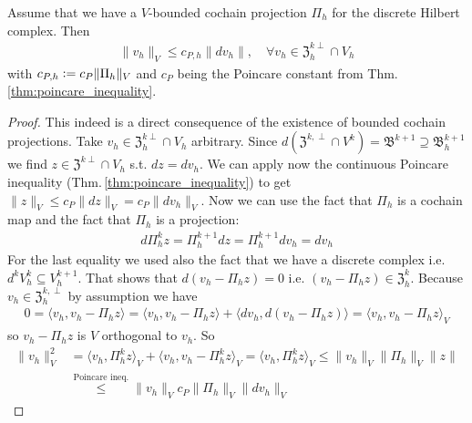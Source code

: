 \documentclass[../master_thesis.tex]{subfiles}
\begin{document}
\begin{proposition}
    Assume that we have a $V$-bounded cochain projection $\Pi_h$ for 
    the discrete Hilbert complex. Then 
    \begin{align*}
        \lVert v_h \rVert _V \leq c_{P,h}  \lVert dv_h \rVert, 
            \quad \forall v_h \in \mathfrak{Z}_h^{k\perp}\cap V_h
    \end{align*}
    with $c_{P,h} \vcentcolon= c_{P} \lVert \Pi_h \rVert _V$  and $c_P$ being the Poincare constant from 
    Thm.\,\ref{thm:poincare_inequality}.
\end{proposition}
\begin{proof}
    This indeed is a direct consequence of the existence of bounded cochain projections.
    Take $v_h \in \mathfrak{Z}_h^{k\perp}\cap V_h$ arbitrary. 
    Since $d (\mathfrak{Z}^{k,\perp} \cap V^k) = \mathfrak{B}^{k+1} \supseteq \mathfrak{B}^{k+1}_h$ we find 
    {\color{red} $z\in \mathfrak{Z}^{k\perp}\cap V_h$} s.t. $dz = dv_h$. We can apply now the continuous 
    Poincare inequality (Thm.\,\ref{thm:poincare_inequality}) to get $\lVert z \rVert _V \leq c_P \lVert dz \rVert _V = c_P \lVert dv_h \rVert _V$.
    Now we can use the fact that $\Pi_h$ is a cochain map 
    and the fact that $\Pi_h$ is a projection:
    \begin{align*}
        d\Pi^k_h z = \Pi^{k+1}_h dz = \Pi^{k+1}_h dv_h = dv_h
    \end{align*}
    For the last equality we used also the fact that we have a discrete complex i.e. $d^k V^k_h \subseteq V^{k+1}_h$.
    That shows that $d(v_h - \Pi_h z) = 0$ i.e. $(v_h - \Pi_h z) \in \mathfrak{Z}_h^k$.
    Because $v_h \in \mathfrak{Z}_h^{k,\perp}$ by assumption we have 
    \begin{align*}
        0 = \langle v_h, v_h - \Pi_h z \rangle = \langle v_h, v_h - \Pi_h z \rangle + \langle dv_h, d(v_h - \Pi_h z) \rangle
            = \langle v_h, v_h - \Pi_h z \rangle _V
    \end{align*}
    so $v_h - \Pi_h z$ is $V$ orthogonal to $v_h$. So 
    \begin{align*}
        \lVert v_h \rVert _V^2 &= \langle v_h, \Pi_h^k z \rangle _V + \langle v_h, v_h - \Pi_h^k z\rangle _V 
        = \langle v_h, \Pi_h^k z \rangle _V \leq \lVert v_h \rVert _V \lVert \Pi_h \rVert _V \lVert z \rVert 
        \\ &\stackrel{\text{Poincare ineq.}}{\leq} \lVert v_h \rVert _V c_P \lVert \Pi_h \rVert _V 
            \lVert dv_h \rVert _V
    \end{align*}
\end{proof}
\end{document}
